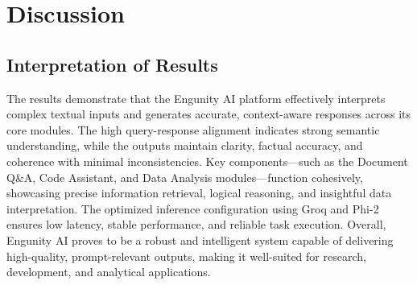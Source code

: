 \section{Discussion}
\subsection{Interpretation of Results}
The results demonstrate that the Engunity AI platform effectively interprets complex textual inputs and generates accurate, context-aware responses across its core modules. The high query-response alignment indicates strong semantic understanding, while the outputs maintain clarity, factual accuracy, and coherence with minimal inconsistencies. Key components—such as the Document Q&A, Code Assistant, and Data Analysis modules—function cohesively, showcasing precise information retrieval, logical reasoning, and insightful data interpretation. The optimized inference configuration using Groq and Phi-2 ensures low latency, stable performance, and reliable task execution. Overall, Engunity AI proves to be a robust and intelligent system capable of delivering high-quality, prompt-relevant outputs, making it well-suited for research, development, and analytical applications.

